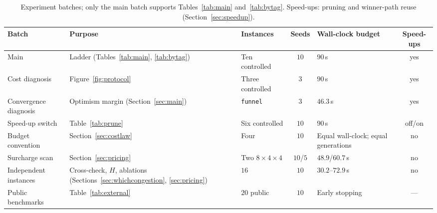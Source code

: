 \documentclass[preprint,review,12pt,authoryear,doubleblind]{elsarticle}
\newcommand{\NSeeds}{10}
\newcommand{\MatrixCells}{16}
\newcommand{\PubNInst}{20}
\begin{document}
\begin{table}[!htbp]
\caption{Experiment batches; only the main batch supports Tables~\ref{tab:main} and~\ref{tab:bytag}. Speed-ups: pruning and winner-path reuse (Section~\ref{sec:speedup}).}
\label{tab:batches}
\footnotesize
\begin{adjustbox}{max width=\linewidth}\begin{tabular}{@{}>{\raggedright\arraybackslash}p{2.3cm}>{\raggedright\arraybackslash}p{3.2cm}>{\raggedright\arraybackslash}p{2.1cm}c>{\raggedright\arraybackslash}p{2.4cm}c@{}}
\toprule
Batch & Purpose & Instances & Seeds & Wall-clock budget & Speed-ups \\
\midrule
Main & Ladder (Tables~\ref{tab:main}, \ref{tab:bytag}) & Ten controlled & $\NSeeds$ & $90$\,s & yes \\
Cost diagnosis & Figure~\ref{fig:protocol} & Three controlled & $3$ & $90$\,s & yes \\
Convergence diagnosis & Optimism margin (Section~\ref{sec:main}) & \texttt{funnel} & $3$ & $46.3$\,s & yes \\
Speed-up switch & Table~\ref{tab:prune} & Six controlled & $10$ & $90$\,s & off/on \\
Budget convention & Section~\ref{sec:costlaw} & Four & $10$ & Equal wall-clock; equal generations & no \\
Surcharge scan & Section~\ref{sec:pricing} & Two $8\times4\times4$ & $10$/$5$ & $48.9$/$60.7$\,s & no \\
Independent instances & Cross-check, $H$, ablations (Sections~\ref{sec:whichcongestion}, \ref{sec:pricing}) & $\MatrixCells$ & $10$ & $30.2$--$72.9$\,s & no \\
Public benchmarks & Table~\ref{tab:external} & $\PubNInst$ public & $\NSeeds$ & Early stopping & --- \\
\bottomrule
\end{tabular}\end{adjustbox}
\end{table}
\end{document}
